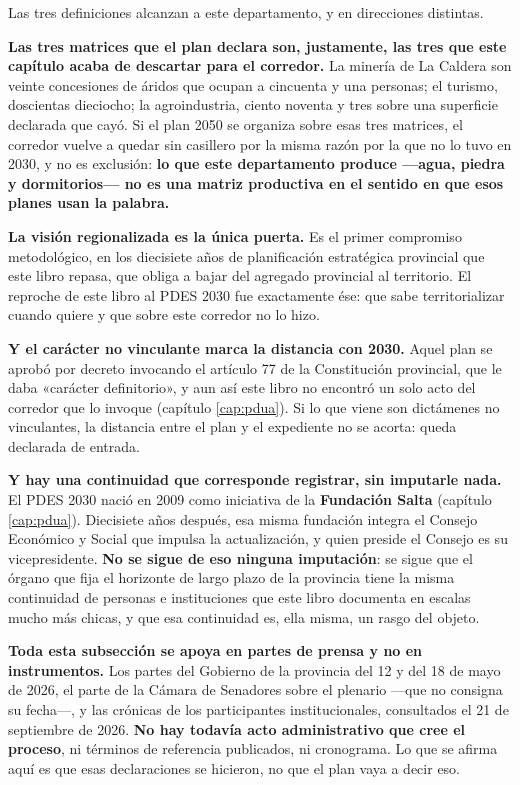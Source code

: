 \begin{cautela}
Las tres definiciones alcanzan a este departamento, y en direcciones distintas.

\textbf{Las tres matrices que el plan declara son, justamente, las tres que este capítulo acaba
de descartar para el corredor.} La minería de La Caldera son veinte concesiones de áridos que
ocupan a cincuenta y una personas; el turismo, doscientas dieciocho; la agroindustria, ciento
noventa y tres sobre una superficie declarada que cayó. Si el plan 2050 se organiza sobre esas
tres matrices, el corredor vuelve a quedar sin casillero por la misma razón por la que no lo
tuvo en 2030, y no es exclusión: \textbf{lo que este departamento produce ---agua, piedra y
dormitorios--- no es una matriz productiva en el sentido en que esos planes usan la palabra.}

\textbf{La visión regionalizada es la única puerta.} Es el primer compromiso metodológico, en
los diecisiete años de planificación estratégica provincial que este libro repasa, que obliga a
bajar del agregado provincial al territorio. El reproche de este libro al PDES 2030 fue
exactamente ése: que sabe territorializar cuando quiere y que sobre este corredor no lo hizo.

\textbf{Y el carácter no vinculante marca la distancia con 2030.} Aquel plan se aprobó por
decreto invocando el artículo 77 de la Constitución provincial, que le daba «carácter
definitorio», y aun así este libro no encontró un solo acto del corredor que lo invoque
(capítulo \ref{cap:pdua}). Si lo que viene son dictámenes no vinculantes, la distancia entre el
plan y el expediente no se acorta: queda declarada de entrada.
\end{cautela}

\textbf{Y hay una continuidad que corresponde registrar, sin imputarle nada.} El PDES 2030 nació
en 2009 como iniciativa de la \textbf{Fundación Salta} (capítulo \ref{cap:pdua}). Diecisiete años
después, esa misma fundación integra el Consejo Económico y Social que impulsa la actualización,
y quien preside el Consejo es su vicepresidente. \textbf{No se sigue de eso ninguna imputación}:
se sigue que el órgano que fija el horizonte de largo plazo de la provincia tiene la misma
continuidad de personas e instituciones que este libro documenta en escalas mucho más chicas, y
que esa continuidad es, ella misma, un rasgo del objeto.

\begin{cautela}
\textbf{Toda esta subsección se apoya en partes de prensa y no en instrumentos.} Los partes del
Gobierno de la provincia del 12 y del 18 de mayo de 2026, el parte de la Cámara de Senadores
sobre el plenario ---que no consigna su fecha---, y las crónicas de los participantes
institucionales, consultados el 21 de septiembre de 2026. \textbf{No hay todavía acto
administrativo que cree el proceso}, ni términos de referencia publicados, ni cronograma. Lo que
se afirma aquí es que esas declaraciones se hicieron, no que el plan vaya a decir eso.
\end{cautela}

